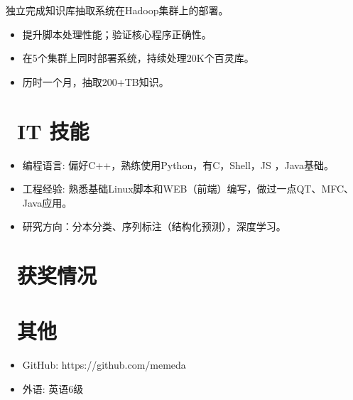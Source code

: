 \documentclass{resume}
\begin{document}
独立完成知识库抽取系统在Hadoop集群上的部署。
\begin{itemize}
  \item 提升脚本处理性能；验证核心程序正确性。
  \item 在5个集群上同时部署系统，持续处理20K个百灵库。
  \item 历时一个月，抽取200+TB知识。
\end{itemize}


\section{\faCogs\ IT 技能}
\begin{itemize}[parsep=0.5ex]
  \item 编程语言: 偏好C++，熟练使用Python，有C，Shell，JS ，Java基础。
  \item 工程经验: 熟悉基础Linux脚本和WEB（前端）编写，做过一点QT、MFC、Java应用。
  \item 研究方向：分本分类、序列标注（结构化预测），深度学习。
\end{itemize}

\section{\faHeartO\ 获奖情况}

\section{\faInfo\ 其他}
\begin{itemize}[parsep=0.5ex]
  \item GitHub: https://github.com/memeda
  \item 外语: 英语6级
\end{itemize}

%
%
\end{document}
